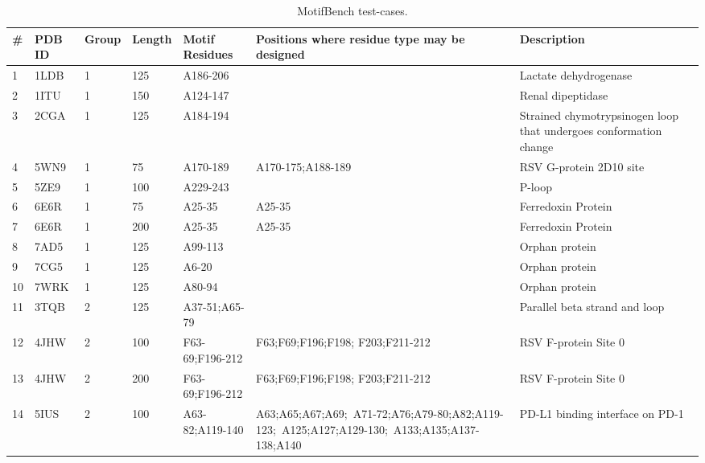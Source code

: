 \begin{footnotesize}
\begin{table}[htbp]
\footnotesize
\caption{MotifBench test-cases.}\label{table:test_cases} 
\begin{tabularx}{\textwidth}{|l|l|l|l|p{3.2cm}|p{3.3cm}|p{3.2cm}|}
\hline
\# & PDB  ID & Group & Length & Motif Residues & Positions where residue type may be designed & Description \\ \hline
\hline
1  & 1LDB & 1 & 125 & A186-206 & & Lactate dehydrogenase \citep{hayes2024simulating} \\ \hline
2  & 1ITU & 1 & 150 & A124-147 &  & Renal dipeptidase \citep{hayes2024simulating} \\ \hline
3  & 2CGA & 1 & 125  & A184-194	& & Strained chymotrypsinogen loop that undergoes conformation change \citep{wang1985bovine} \\ \hline
4  & 5WN9 & 1 & 75 & A170-189 & A170-175;A188-189 & RSV G-protein 2D10 site \citep{yang2021bottom} \\ \hline
5  & 5ZE9 & 1 & 100 & A229-243 & & P-loop \citep{hayes2024simulating} \\ \hline
6  & 6E6R & 1 & 75 & A25-35 & A25-35 & Ferredoxin Protein \citep{trippe2022diffusion} \\ \hline
7  & 6E6R & 1 & 200 & A25-35 & A25-35 & Ferredoxin Protein \citep{trippe2022diffusion} \\ \hline
8  & 7AD5 & 1 & 125 & A99-113 &  & Orphan protein \citep{wu2022omegafold} \\ \hline
9  & 7CG5 & 1 & 125 & A6-20 &  & Orphan protein \citep{wu2022omegafold} \\ \hline
10  & 7WRK & 1 & 125 & A80-94 & & Orphan protein \citep{wu2022omegafold} \\ \hline
\hline
11  & 3TQB & 2 & 125 & A37-51;A65-79 & & Parallel beta strand and loop \citep{tkaczuk2013structural} \\ \hline
12  & 4JHW & 2 & 100 & F63-69;F196-212 & F63;F69;F196;F198; F203;F211-212 & RSV F-protein Site 0 \citep{sesterhenn2020novo} \\ \hline
13  & 4JHW & 2 & 200 & F63-69;F196-212 & F63;F69;F196;F198; F203;F211-212  & RSV F-protein Site 0 \citep{sesterhenn2020novo} \\ \hline
14  & 5IUS & 2 & 100 & A63-82;A119-140 & A63;A65;A67;A69;\ A71-72;A76;A79-80;A82;A119-123;\ A125;A127;A129-130;\ A133;A135;A137-138;A140 & PD-L1 binding interface on PD-1 \citep{watson2022broadly} \\ \hline

\end{tabularx}
\end{table}
\end{footnotesize}
